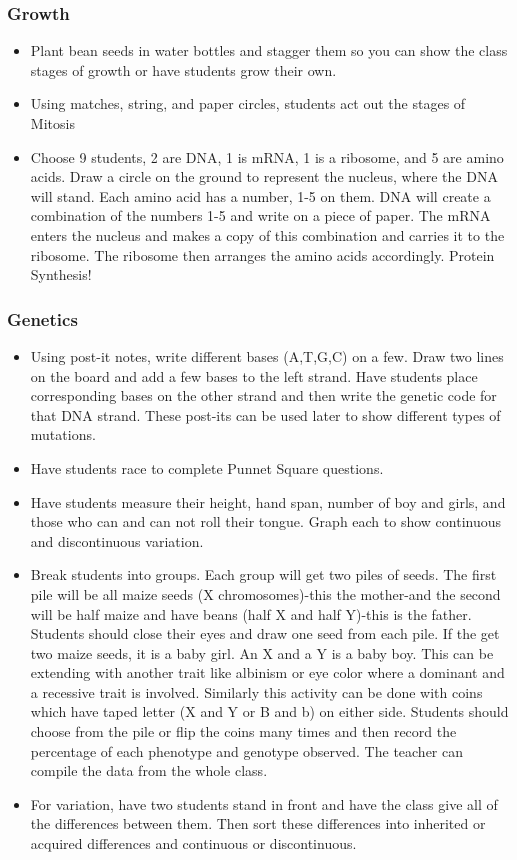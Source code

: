\subsubsection{Growth}
\begin{itemize}
\item	Plant bean seeds in water bottles and stagger them so you can show the class stages of growth or have students grow their own.
\item	Using matches, string, and paper circles, students act out the stages of Mitosis
\item	Choose 9 students, 2 are DNA, 1 is mRNA, 1 is a ribosome, and 5 are amino acids. Draw a circle on the ground to represent the nucleus, where the DNA will stand.  Each amino acid has a number, 1-5 on them.  DNA will create a combination of the numbers 1-5 and write on a piece of paper.  The mRNA enters the nucleus and makes a copy of this combination and carries it to the ribosome.  The ribosome then arranges the amino acids accordingly.  Protein Synthesis!
\end{itemize}

\subsubsection{Genetics}
\begin{itemize}
\item Using post-it notes, write different bases (A,T,G,C) on a few.  Draw two lines on the board and add a few bases to the left strand.  Have students place corresponding bases on the other strand and then write the genetic code for that DNA strand.  These post-its can be used later to show different types of mutations.
\item Have students race to complete Punnet Square questions.
\item Have students measure their height, hand span, number of boy and girls, and those who can and can not roll their tongue.  Graph each to show continuous and discontinuous variation.
\item Break students into groups. Each group will get two piles of seeds. The first pile will be all maize seeds (X chromosomes)-this the mother-and the second will be half maize and have beans (half X and half Y)-this is the father. Students should close their eyes and draw one seed from each pile. If the get two maize seeds, it is a baby girl. An X and a Y is a baby boy. This can be extending with another trait like albinism or eye color where a dominant and a recessive trait is involved.
Similarly this activity can be done with coins which have taped letter (X and Y or B and b) on either side. Students should choose from the pile or flip the coins many times and then record the percentage of each phenotype and genotype observed. The teacher can compile the data from the whole class.
\item For variation, have two students stand in front and have the class give all of the differences between them. Then sort these differences into inherited or acquired differences and continuous or discontinuous.
\end{itemize}

